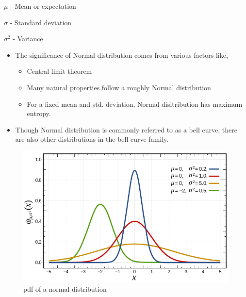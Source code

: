 \documentclass[	DIV=calc,%
paper=a4,%
fontsize=11pt,%
twocolumn]{scrartcl} %
\begin{document}
	$\mu$ - Mean or expectation
	
	$\sigma$ - Standard deviation
	
	$\sigma^2$ - Variance
	
\begin{itemize}
	\item The significance of Normal distribution comes from various factors like,
		\begin{itemize}
			\item Central limit theorem
			\item Many natural properties follow a roughly Normal distribution
			\item For a fixed mean and std. deviation, Normal disitribution has maximum entropy.
		\end{itemize}
	\item Though Normal distribution is commonly referred to as a bell curve, there are also other distributions in the bell curve family.
\end{itemize}


\begin{figure}[ht!]
	\centering
	\caption{pdf of a normal distribution}
	\graphicspath{ {images/math/} }
	\includegraphics[width=\linewidth]{normal_distribution_pdf}
\end{figure}
\end{document}
